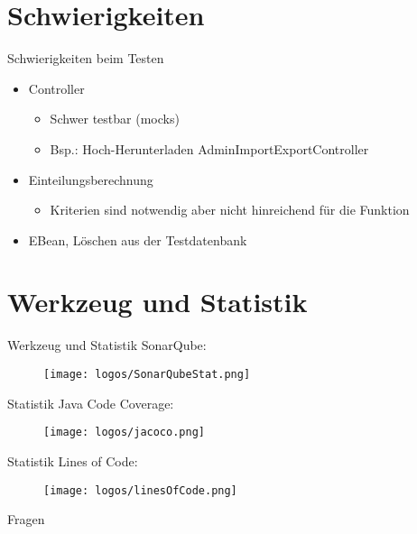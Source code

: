 \documentclass[18pt, xcolor=table]{beamer}
\begin{document}
\section{Schwierigkeiten}
\begin{frame}{Schwierigkeiten beim Testen}
\begin{itemize}
  \item Controller
  \begin{itemize}
  	\item Schwer testbar (mocks)
  	\item Bsp.: Hoch-Herunterladen AdminImportExportController 
  \end{itemize}
  \item Einteilungsberechnung
  \begin{itemize}
  	\item Kriterien sind notwendig aber nicht hinreichend für die Funktion	
  \end{itemize}
  \item EBean, Löschen aus der Testdatenbank
\end{itemize}
\end{frame}

\section{Werkzeug und Statistik}
\begin{frame}{Werkzeug und Statistik}
	SonarQube:
	\begin{figure}
  			\texttt{[image: logos/SonarQubeStat.png]}
  		\end{figure}
\end{frame}

\begin{frame}{Statistik}
	Java Code Coverage:
	\begin{figure}
  			\texttt{[image: logos/jacoco.png]}
  		\end{figure}
\end{frame}

\begin{frame}{Statistik}
	Lines of Code:
	\begin{figure}
  			\texttt{[image: logos/linesOfCode.png]}
  	\end{figure}
\end{frame}

\appendix
\beginbackup

\begin{frame}{Fragen}
\printbibliography
\end{frame}

\backupend
\end{document}

